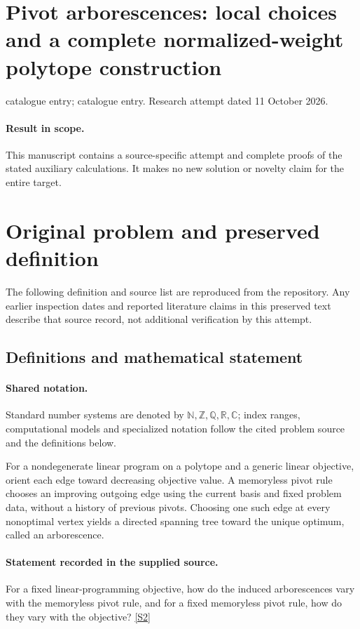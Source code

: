 \documentclass[11pt]{article}
\begin{document}
\section*{Pivot arborescences: local choices and a complete normalized-weight polytope construction}
\noindent catalogue entry; catalogue entry. Research attempt dated 11 October 2026.
\paragraph{Result in scope.}This manuscript contains a source-specific attempt and complete proofs of the stated auxiliary calculations. It makes no new solution or novelty claim for the entire target.
\section{Original problem and preserved definition}
The following definition and source list are reproduced from the repository. Any earlier inspection dates and reported literature claims in this preserved text describe that source record, not additional verification by this attempt.
\subsection{Definitions and mathematical statement}

\paragraph{Shared notation.}Standard number systems are denoted by $\mathbb N,\mathbb Z,\mathbb Q,\mathbb R,\mathbb C$; index ranges, computational models and specialized notation follow the cited problem source and the definitions below.


For a nondegenerate linear program on a polytope and a generic linear objective, orient each edge toward decreasing objective value. A memoryless pivot rule chooses an improving outgoing edge using the current basis and fixed problem data, without a history of previous pivots. Choosing one such edge at every nonoptimal vertex yields a directed spanning tree toward the unique optimum, called an arborescence.
\paragraph{Statement recorded in the supplied source.}
For a fixed linear-programming objective, how do the induced arborescences vary with the memoryless pivot rule, and for a fixed memoryless pivot rule, how do they vary with the objective? \href{https://doi.org/10.4171/owr/2021/53}{[S2]}
\end{document}
